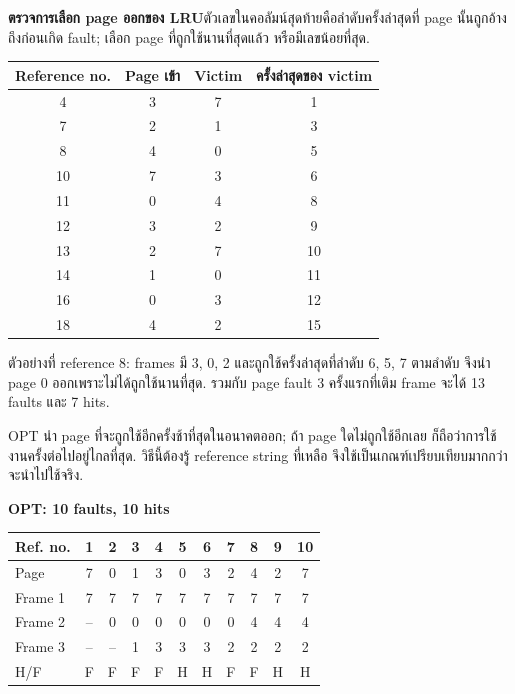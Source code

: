 \noindent\textbf{ตรวจการเลือก page ออกของ LRU}\quad ตัวเลขในคอลัมน์สุดท้ายคือลำดับครั้งล่าสุดที่ page นั้นถูกอ้างถึงก่อนเกิด fault; เลือก page ที่ถูกใช้นานที่สุดแล้ว หรือมีเลขน้อยที่สุด.\par\smallskip
{\small\begin{center}\renewcommand{\arraystretch}{1.12}\begin{tabular}{c|c|c|c}
Reference no. & Page เข้า & Victim & ครั้งล่าสุดของ victim\\\hline
4 & 3 & 7 & 1\\
7 & 2 & 1 & 3\\
8 & 4 & 0 & 5\\
10 & 7 & 3 & 6\\
11 & 0 & 4 & 8\\
12 & 3 & 2 & 9\\
13 & 2 & 7 & 10\\
14 & 1 & 0 & 11\\
16 & 0 & 3 & 12\\
18 & 4 & 2 & 15\\
\end{tabular}\end{center}}
\noindent ตัวอย่างที่ reference 8: frames มี 3, 0, 2 และถูกใช้ครั้งล่าสุดที่ลำดับ 6, 5, 7 ตามลำดับ จึงนำ page 0 ออกเพราะไม่ได้ถูกใช้นานที่สุด. รวมกับ page fault 3 ครั้งแรกที่เติม frame จะได้ 13 faults และ 7 hits.\par
\newpage{}
\noindent OPT นำ page ที่จะถูกใช้อีกครั้งช้าที่สุดในอนาคตออก; ถ้า page ใดไม่ถูกใช้อีกเลย ก็ถือว่าการใช้งานครั้งต่อไปอยู่ไกลที่สุด. วิธีนี้ต้องรู้ reference string ที่เหลือ จึงใช้เป็นเกณฑ์เปรียบเทียบมากกว่าจะนำไปใช้จริง.\par\smallskip
\noindent\textbf{OPT: 10 faults, 10 hits}
{\setlength{\tabcolsep}{5pt}\begin{center}\renewcommand{\arraystretch}{1.15}\begin{tabular}{l|cccccccccc}
Ref. no. & 1 & 2 & 3 & 4 & 5 & 6 & 7 & 8 & 9 & 10\\\hline
Page & 7 & 0 & 1 & 3 & 0 & 3 & 2 & 4 & 2 & 7\\
Frame 1 & 7 & 7 & 7 & 7 & 7 & 7 & 7 & 7 & 7 & 7\\
Frame 2 & -- & 0 & 0 & 0 & 0 & 0 & 0 & 4 & 4 & 4\\
Frame 3 & -- & -- & 1 & 3 & 3 & 3 & 2 & 2 & 2 & 2\\
H/F & F & F & F & F & H & H & F & F & H & H\\
\end{tabular}\end{center}}
